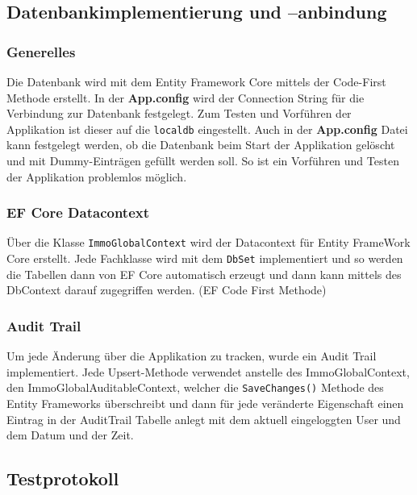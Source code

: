 \newpage
\subsection{Datenbankimplementierung und –anbindung}
\subsubsection{Generelles}
Die Datenbank wird mit dem Entity Framework Core mittels der Code-First Methode erstellt. In der \textbf{App.config} wird der Connection String für die Verbindung zur Datenbank festgelegt. Zum Testen und Vorführen der Applikation ist dieser auf die \verb+localdb+ eingestellt. Auch in der \textbf{App.config} Datei kann festgelegt werden, ob die Datenbank beim Start der Applikation gelöscht und mit Dummy-Einträgen gefüllt werden soll. So ist ein Vorführen und Testen der Applikation problemlos möglich.

\subsubsection{EF Core Datacontext}
Über die Klasse \verb+ImmoGlobalContext+  wird der Datacontext für Entity FrameWork Core erstellt. Jede Fachklasse wird mit dem \verb+DbSet+ implementiert und so werden die Tabellen dann von EF Core automatisch erzeugt und dann kann mittels des DbContext darauf zugegriffen werden. (EF Code First Methode)

\subsubsection{Audit Trail}
Um jede Änderung über die Applikation zu tracken, wurde ein Audit Trail implementiert. Jede Upsert-Methode verwendet anstelle des ImmoGlobalContext, den ImmoGlobalAuditableContext, welcher die \verb+SaveChanges()+ Methode des Entity Frameworks überschreibt und dann für jede veränderte Eigenschaft einen Eintrag in der AuditTrail Tabelle anlegt mit dem aktuell eingeloggten User und dem Datum und der Zeit.


\subsection{Testprotokoll}
